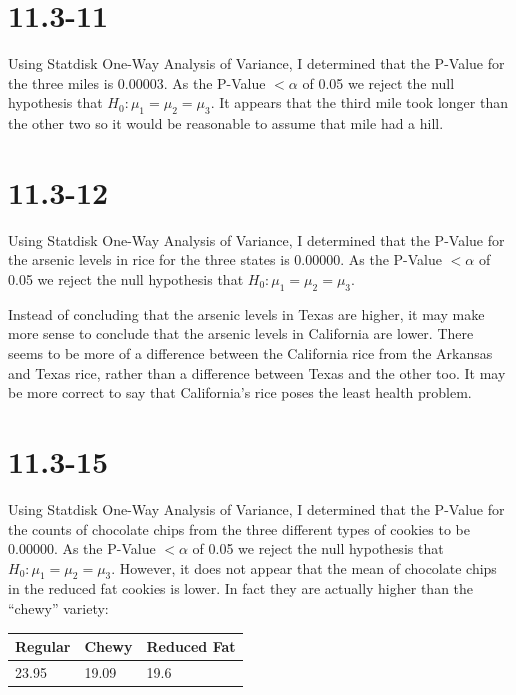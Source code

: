 \documentclass[12pt,fleqn]{article}
\newcommand{\problemeleventhree}[1]{\vspace{5ex}\section*{11.3-#1}}
\newcommand{\thead}[1]{\textnormal{\textbf{#1}}}
\begin{document}
\problemeleventhree{11}
Using Statdisk One-Way Analysis of Variance, I determined that the P-Value for the three miles is 0.00003. As the P-Value $< \alpha$ of 0.05 we reject the null hypothesis that $H_0: \mu_1 = \mu_2 = \mu_3$. It appears that the third mile took longer than the other two so it would be reasonable to assume that mile had a hill.


\problemeleventhree{12}
Using Statdisk One-Way Analysis of Variance, I determined that the P-Value for the arsenic levels in rice for the three states is 0.00000. As the P-Value $< \alpha$ of 0.05 we reject the null hypothesis that $H_0: \mu_1 = \mu_2 = \mu_3$.

Instead of concluding that the arsenic levels in Texas are higher, it may make more sense to conclude that the arsenic levels in California are lower. There seems to be more of a difference between the California rice from the Arkansas and Texas rice, rather than a difference between Texas and the other too. It may be more correct to say that California's rice poses the least health problem.


\problemeleventhree{15}
Using Statdisk One-Way Analysis of Variance, I determined that the P-Value for the counts of chocolate chips from the three different types of cookies to be 0.00000. As the P-Value $< \alpha$ of 0.05 we reject the null hypothesis that $H_0: \mu_1 = \mu_2 = \mu_3$. However, it does not appear that the mean of chocolate chips in the reduced fat cookies is lower. In fact they are actually higher than the ``chewy'' variety:

  \begin{tabular}{@{}lll@{}}
    \thead{Regular} & \thead{Chewy} & \thead{Reduced Fat} \\
    \toprule
    23.95 & 19.09 & 19.6 \\
    \bottomrule
  \end{tabular}
  \vspace{.25cm}
\end{document}
